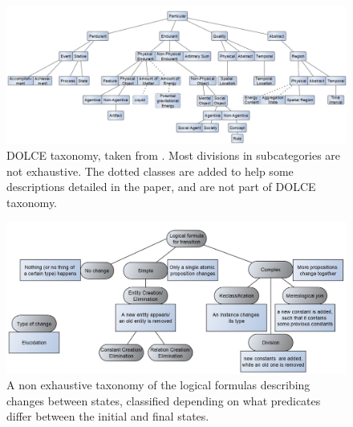 \documentclass[sw]{iosart2x}
\newcommand{\DOLCE}{\textsc{DOLCE}\xspace} %
\begin{document}
\begin{figure}
  \centering
  \includegraphics[width=\textwidth]{DOLCE-taxav2.JPG}
  \caption{\label{fig:DOLCE-taxa} \DOLCE taxonomy, taken from \cite{borgoDOLCEDescriptiveOntology2022}. Most divisions in subcategories are not exhaustive. The dotted classes are added to help some descriptions detailed in the paper, and are not part of \DOLCE taxonomy.}
\end{figure}
\begin{figure}
  \centering
  \includegraphics[width=\textwidth]{onto-func-logicv2.JPG}
  \caption{\label{fig:onto-func-logic} A non exhaustive taxonomy of the logical formulas describing changes between states, classified depending on what predicates differ between the initial and final states.}
\end{figure}
\end{document}
